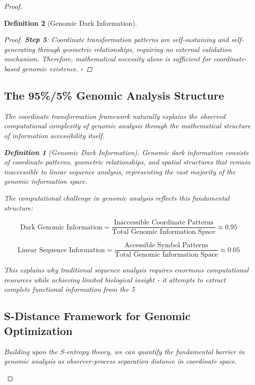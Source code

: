 \documentclass[12pt,a4paper]{article}
\newtheorem{definition}{Definition}
\begin{document}
\begin{proof}
\begin{definition}[Genomic Dark Information]
\begin{algorithm}[H]
\begin{proof}
\textbf{Step 5}: Coordinate transformation patterns are self-sustaining and self-generating through geometric relationships, requiring no external validation mechanism. Therefore, mathematical necessity alone is sufficient for coordinate-based genomic existence. $\square$
\end{proof}

\subsection{The 95\%/5\% Genomic Analysis Structure}

The coordinate transformation framework naturally explains the observed computational complexity of genomic analysis through the mathematical structure of information accessibility itself.

\begin{definition}[Genomic Dark Information]
Genomic dark information consists of coordinate patterns, geometric relationships, and spatial structures that remain inaccessible to linear sequence analysis, representing the vast majority of the genomic information space.
\end{definition}

The computational challenge in genomic analysis reflects this fundamental structure:

\begin{equation}
\text{Dark Genomic Information} = \frac{\text{Inaccessible Coordinate Patterns}}{\text{Total Genomic Information Space}} \approx 0.95
\end{equation}

\begin{equation}
\text{Linear Sequence Information} = \frac{\text{Accessible Symbol Patterns}}{\text{Total Genomic Information Space}} \approx 0.05
\end{equation}

This explains why traditional sequence analysis requires enormous computational resources while achieving limited biological insight - it attempts to extract complete functional information from the 5%

\subsection{S-Distance Framework for Genomic Optimization}

Building upon the S-entropy theory, we can quantify the fundamental barrier in genomic analysis as observer-process separation distance in coordinate space.


\end{algorithm}
\end{definition}
\end{proof}
\end{document}
